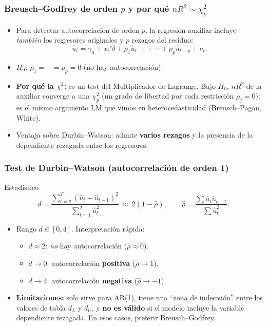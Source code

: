 \documentclass{beamer}
\begin{document}
\begin{frame}
\frametitle{Breusch--Godfrey de orden $p$ y por qué $nR^2\sim\chi^2_p$}

\begin{itemize}
  \item Para detectar autocorrelación de orden $p$, la regresión auxiliar incluye \emph{también} los regresores originales y $p$ rezagos del residuo:
  \[
  \hat u_t = \gamma_0 + x_t'\delta + \rho_1\hat u_{t-1} + \cdots + \rho_p\hat u_{t-p} + \nu_t.
  \]
  \item $H_0:\ \rho_1=\cdots=\rho_p=0$ (no hay autocorrelación).
  \item \textbf{Por qué la $\chi^2$:} es un test del Multiplicador de Lagrange. Bajo $H_0$, $nR^2$ de la auxiliar converge a una $\chi^2_p$ (un grado de libertad por cada restricción $\rho_j=0$); es el mismo argumento LM que vimos en heterocedasticidad (Breusch--Pagan, White).
  \item Ventaja sobre Durbin--Watson: admite \textbf{varios rezagos} y la presencia de la dependiente rezagada entre los regresores.
\end{itemize}

\end{frame}

\begin{frame}
\frametitle{Test de Durbin--Watson (autocorrelación de orden 1)}

\begin{block}{Estadístico}
\[
d = \frac{\sum_{t=2}^{T}(\hat u_t - \hat u_{t-1})^2}{\sum_{t=1}^{T}\hat u_t^2}\ \approx\ 2(1-\hat\rho),
\qquad \hat\rho=\frac{\sum \hat u_t\hat u_{t-1}}{\sum \hat u_t^2}.
\]
\end{block}

\begin{itemize}
  \item Rango $d\in[0,4]$. Interpretación rápida:
  \begin{itemize}
    \item $d\approx 2$: \emph{no} hay autocorrelación ($\hat\rho\approx0$).
    \item $d\to 0$: autocorrelación \textbf{positiva} ($\hat\rho\to1$).
    \item $d\to 4$: autocorrelación \textbf{negativa} ($\hat\rho\to-1$).
  \end{itemize}
  \item \textbf{Limitaciones:} solo sirve para AR(1), tiene una ``zona de indecisión'' entre los valores de tabla $d_L$ y $d_U$, y \textbf{no es válido} si el modelo incluye la variable dependiente rezagada. En esos casos, preferir Breusch--Godfrey.
\end{itemize}

\end{frame}
\end{document}
